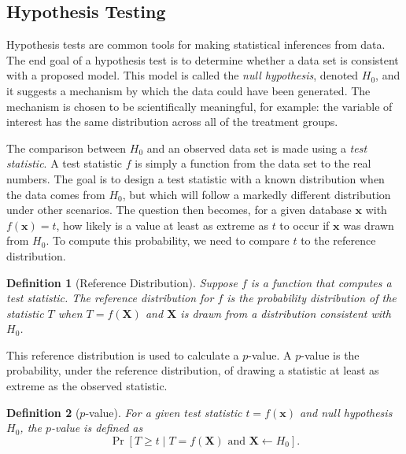 \documentclass[USenglish,oneside]{article}
\newcounter{ab}
\newcounter{ar}
\newcounter{igh}
\newtheorem{definition}{Definition}
\newcommand{\x}{\ensuremath{\mathbf{x}}\xspace}
\newcommand{\X}{\ensuremath{\mathbf{X}}\xspace}
\newcommand{\data}{\ensuremath{\mathbf{x}}\xspace}
\newcommand{\Data}{\ensuremath{\mathbf{X}}\xspace}
\begin{document}
\subsection{Hypothesis Testing}
Hypothesis tests are common tools for making statistical inferences from data. The end goal of a hypothesis test is to determine whether a data set is consistent with a proposed model. This model is called the \textit{null hypothesis}, denoted $H_0$, and it suggests a mechanism by which the data could have been generated. The mechanism is chosen to be scientifically meaningful, for example: the variable of interest has the same distribution across all of the treatment groups.

The comparison between $H_0$ and an observed data set is made using a \textit{test statistic}.  A test statistic $f$ is simply a function from the data set to the real numbers.  The goal is to design a test statistic with a known distribution when the data comes from $H_0$, but which will follow a markedly different distribution under other scenarios.  The question then becomes, for a given database $\data$ with $f(\data)=t$, how likely is a value at least as extreme as $t$ to occur if $\data$ was drawn from $H_0$.  To compute this probability, we need to compare $t$ to the reference distribution.


\begin{definition}[Reference Distribution] \label{def:refdist}
Suppose $f$ is a function that computes a test statistic. The reference distribution for $f$ is the probability distribution of the statistic $T$ when $T=f(\Data)$ and $\Data$ is drawn from a distribution consistent with $H_0$.
\end{definition}

This reference distribution is used to calculate a $p$-value. A $p$-value is the probability, under the reference distribution, of drawing a statistic at least as extreme as the observed statistic.

\begin{definition}[$p$-value] \label{def:pvalue}
For a given test statistic $t=f(\x)$ and null hypothesis $H_0$, the $p$-value is defined as
\begin{equation*}
\Pr[T\geq t \mid T = f(\X) \text{ and } \X \leftarrow H_0].
\end{equation*}
\end{definition}
\end{document}
